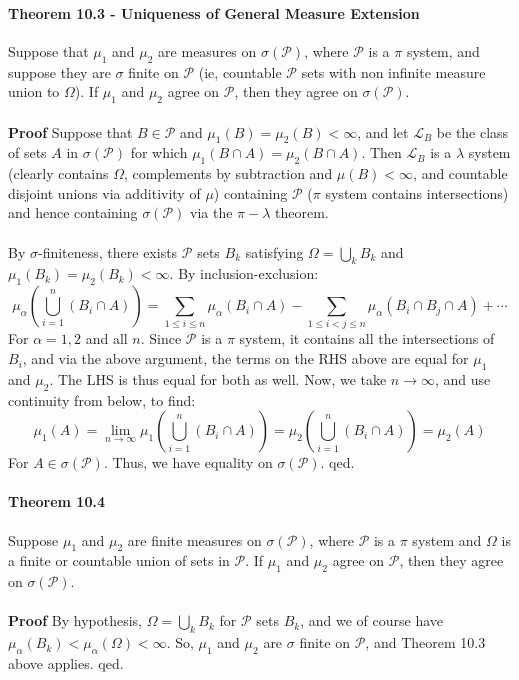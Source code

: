 \documentclass[12pt,a4paper]{article}
\newcommand{\1}[1]{\mathbbm{1}\left\{ #1 \right\}}
\newcommand{\lcal}{\mathcal{L}}
\newcommand{\pcal}{\mathcal{P}}
\begin{document}
\paragraph{Theorem 10.3 - Uniqueness of General Measure Extension} Suppose that $\mu_1$ and $\mu_2$ are measures on $\sigma(\pcal)$, where $\pcal$ is a $\pi$ system, and suppose they are $\sigma$ finite on $\pcal$ (ie, countable $\pcal$ sets with non infinite measure union to $\Omega$). If $\mu_1$ and $\mu_2$ agree on $\pcal$, then they agree on $\sigma(\pcal)$.
\\\\
\textbf{Proof} Suppose that $B \in \pcal$ and $\mu_1(B) = \mu_2(B) < \infty$, and let $\lcal_B$ be the class of sets $A$ in $\sigma(\pcal)$ for which $\mu_1(B \cap A) = \mu_2(B \cap A)$. Then $\lcal_B$ is a $\lambda$ system (clearly contains $\Omega$, complements by subtraction and $\mu(B) < \infty$, and countable disjoint unions via additivity of $\mu$) containing $\pcal$ ($\pi$ system contains intersections) and hence containing $\sigma(\pcal)$ via the $\pi-\lambda$ theorem.
\\\\
By $\sigma$-finiteness, there exists $\pcal$ sets $B_k$ satisfying $\Omega = \bigcup_k B_k$ and $\mu_1(B_k) = \mu_2(B_k) < \infty$. By inclusion-exclusion:
$$
	\mu_\alpha\left(\bigcup_{i=1}^n (B_i \cap A)\right) = \sum_{1 \leq i \leq n} \mu_\alpha(B_i \cap A) -
	\sum_{1 \leq i < j \leq n} \mu_\alpha(B_i \cap B_j \cap A) + \cdots
$$
For $\alpha = 1, 2$ and all $n$. Since $\pcal$ is a $\pi$ system, it contains all the intersections of $B_i$, and via the above argument, the terms on the RHS above are equal for $\mu_1$ and $\mu_2$. The LHS is thus equal for both as well. Now, we take $n \to \infty$, and use continuity from below, to find:
$$
	\mu_1(A) = \lim_{n \to \infty} \mu_1\left(\bigcup_{i=1}^n (B_i \cap A)\right) =
	\mu_2\left(\bigcup_{i=1}^n (B_i \cap A)\right) = \mu_2(A)
$$
For $A \in \sigma(\pcal)$. Thus, we have equality on $\sigma(\pcal)$. qed.

\paragraph{Theorem 10.4} Suppose $\mu_1$ and $\mu_2$ are finite measures on $\sigma(\pcal)$, where $\pcal$ is a $\pi$ system and $\Omega$ is a finite or countable union of sets in $\pcal$. If $\mu_1$ and $\mu_2$ agree on $\pcal$, then they agree on $\sigma(\pcal)$.
\\\\
\textbf{Proof} By hypothesis, $\Omega = \bigcup_k B_k$ for $\pcal$ sets $B_k$, and we of course have $\mu_\alpha(B_k) < \mu_\alpha(\Omega) < \infty$. So, $\mu_1$ and $\mu_2$ are $\sigma$ finite on $\pcal$, and Theorem 10.3 above applies. qed.
\end{document}
